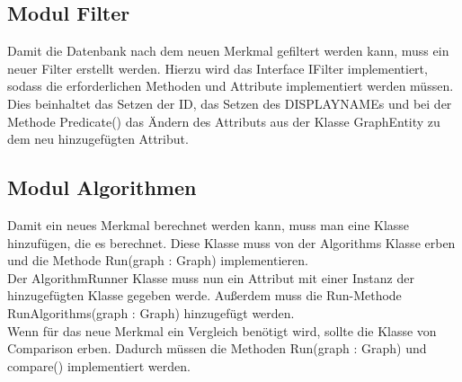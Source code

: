 \documentclass[13pt]{scrreprt}
\begin{document}
\subsection{Modul Filter}
Damit die Datenbank nach dem neuen Merkmal gefiltert werden kann, muss ein neuer Filter erstellt werden. Hierzu wird das Interface IFilter implementiert, sodass die erforderlichen Methoden und Attribute implementiert werden müssen.
Dies beinhaltet das Setzen der ID, das Setzen des DISPLAYNAMEs und bei der Methode Predicate() das Ändern des Attributs aus der Klasse GraphEntity zu dem neu hinzugefügten Attribut.

\subsection{Modul Algorithmen}
Damit ein neues Merkmal berechnet werden kann, muss man eine Klasse hinzufügen, die es berechnet. Diese Klasse muss von der Algorithms Klasse erben und die Methode Run(graph : Graph) implementieren.\\
Der AlgorithmRunner Klasse muss nun ein Attribut mit einer Instanz der hinzugefügten Klasse gegeben werde. Außerdem muss die Run-Methode RunAlgorithms(graph : Graph) hinzugefügt werden. \\
Wenn für das neue Merkmal ein Vergleich benötigt wird, sollte die Klasse von Comparison erben. Dadurch müssen die Methoden Run(graph : Graph) und compare() implementiert werden.
\end{document}
